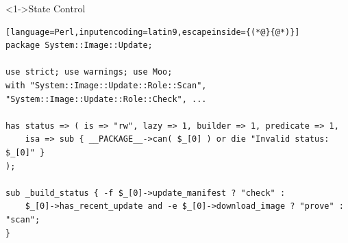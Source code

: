 \documentclass[ngerman,xcolor={table,dvipsnames},smaller,compress,hyperref={bookmarks,colorlinks}]{beamer}%
\begin{document}
\begin{frame}[t,fragile]

\begin{block}<1->{State Control}
\scriptsize
\begin{lstlisting}[language=Perl,inputencoding=latin9,escapeinside={(*@}{@*)}]
package System::Image::Update;

use strict; use warnings; use Moo;
with "System::Image::Update::Role::Scan", "System::Image::Update::Role::Check", ...

has status => ( is => "rw", lazy => 1, builder => 1, predicate => 1,
    isa => sub { __PACKAGE__->can( $_[0] ) or die "Invalid status: $_[0]" }
);

sub _build_status { -f $_[0]->update_manifest ? "check" :
    $_[0]->has_recent_update and -e $_[0]->download_image ? "prove" : "scan";
}
\end{lstlisting}
\end{block}

\begin{itemize}
\end{itemize}

\end{frame}
\end{document}
